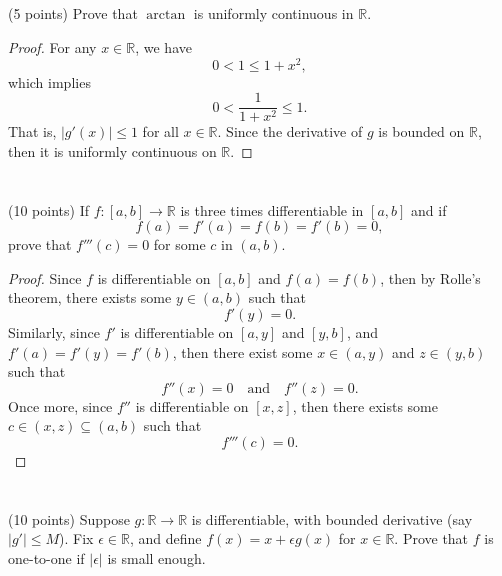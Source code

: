 \documentclass[12pt]{article}
\newenvironment{problem}
    {\begin{lrbox}{\mybox}\begin{minipage}{0.98\textwidth}}
    {\end{minipage}\end{lrbox}\begin{center}\framebox[\textwidth]{\usebox{\mybox}}\end{center}}
\theoremstyle{definition}
\newcommand{\isp}[1]{\quad\text{#1}\quad}
\newcommand{\R}{\mathbb{R}}
\begin{document}
\subsection{}
\begin{problem}
     (5 points) Prove that $\arctan$ is uniformly continuous in $\R$.
\end{problem}

\begin{proof}
    For any $x \in \R$, we have
    \[
        0 < 1 \leq 1 + x^2,
    \]
    which implies
    \[
        0 < \frac{1}{1 + x^2} \leq 1.
    \]
    That is, $|g'(x)| \leq 1$ for all $x \in \R$. Since the derivative of $g$ is bounded on $\R$, then it is uniformly continuous on $\R$.
    
\end{proof}


\section{}
\begin{problem}
    (10 points) If $f:[a,b]\to \R$ is three times differentiable in $[a,b]$ and if 
    \begin{equation}
     f(a) = f'(a) = f(b) = f'(b) = 0,
    \end{equation}
    prove that $f'''(c) = 0$ for some $c$ in $(a,b)$.
\end{problem}

\begin{proof}
    Since $f$ is differentiable on $[a, b]$ and $f(a) = f(b)$, then by Rolle's theorem, there exists some $y \in (a, b)$ such that
    \[
        f'(y) = 0.
    \]
    Similarly, since $f'$ is differentiable on $[a, y]$ and $[y, b]$, and $f'(a) = f'(y) = f'(b)$, then there exist some $x \in (a, y)$ and $z \in (y, b)$ such that
    \[
        f''(x) = 0 \isp{and} f''(z) = 0.
    \]
    Once more, since $f''$ is differentiable on $[x, z]$, then there exists some $c \in (x, z) \subseteq (a, b)$ such that
    \[
        f'''(c) = 0.
    \]
    
\end{proof}

\newpage
\section{}
\begin{problem}
     (10 points) Suppose $g:\R\to\R$ is differentiable, with bounded derivative (say $|g'|\le M$). Fix $\epsilon \in \R$, and define $f(x) = x  + \epsilon g(x)$ for $x\in \R$. Prove that $f$ is one-to-one if $|\epsilon|$ is small enough.
\end{problem}
\end{document}
